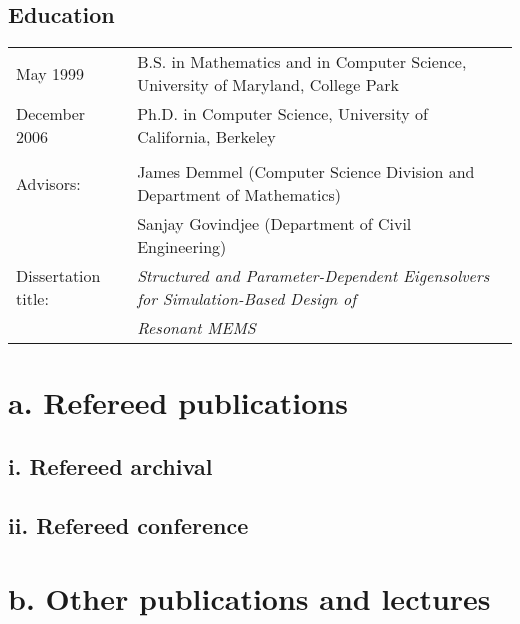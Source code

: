 \documentclass{article}
\begin{document}
\subsection*{Education}

\begin{tabular}{ll}
May 1999 &
  B.S. in Mathematics and in Computer Science,
  University of Maryland, College Park \\
December 2006 &
  Ph.D. in Computer Science, University of California, Berkeley
\\
\\
Advisors:
 & James Demmel (Computer Science Division and Department of Mathematics) \\
 & Sanjay Govindjee (Department of Civil Engineering) \\
Dissertation title: &
   {\em Structured and Parameter-Dependent Eigensolvers for
        Simulation-Based Design of} \\
&  {\em Resonant MEMS}
\end{tabular}




\section*{a. Refereed publications}

\subsection*{i. Refereed archival}



\subsection*{ii. Refereed conference}




\section*{b. Other publications and lectures}
\end{document}
